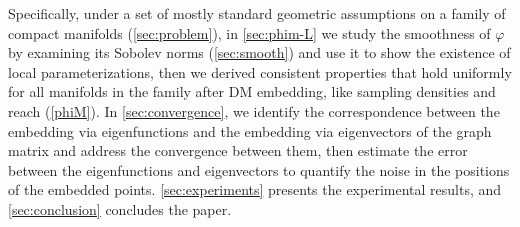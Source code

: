 Specifically, under a set of mostly standard geometric assumptions on a family of compact manifolds (\cref{sec:problem}), in \cref{sec:phim-L} we study the smoothness of $\varphi$ by examining its Sobolev norms (\cref{sec:smooth}) and use it to show the existence of local parameterizations, then we derived consistent properties that hold uniformly for all manifolds in the family after DM embedding, like sampling densities and reach (\cref{phiM}). In \cref{sec:convergence}, we identify the correspondence between the embedding via eigenfunctions and the embedding via eigenvectors of the graph matrix and address the convergence between them, then estimate the error between the eigenfunctions and eigenvectors to quantify the noise in the positions of the embedded points. \cref{sec:experiments} presents the experimental results, and \cref{sec:conclusion} concludes the paper.

